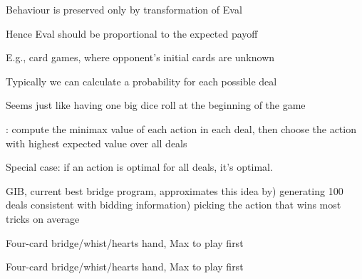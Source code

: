 \documentclass{article}
\begin{document}
\begin{huge}

\vspace*{0.3in}

\textwidth
{}


Behaviour is preserved only by  transformation of
{\sc Eval}

Hence {\sc Eval} should be proportional to the expected payoff



E.g., card games, where opponent's initial cards are unknown

Typically we can calculate a probability for each possible deal

Seems just like having one big dice roll at the beginning of the game\mat{$^*$}

: compute the minimax value of each action in each deal,\nl
   then choose the action with highest expected value over all deals\mat{$^*$}

Special case: if an action is optimal for all deals, it's optimal.\mat{$^*$}

GIB, current best bridge program, approximates this idea by) generating 100 deals consistent with bidding information) picking the action that wins most tricks on average 



Four-card bridge/whist/hearts hand, {\sc Max} to play first

\vspace*{0.1in}

\textwidth
{}


Four-card bridge/whist/hearts hand, {\sc Max} to play first

\vspace*{0.1in}

\textwidth
{}



\end{huge}
\end{document}
